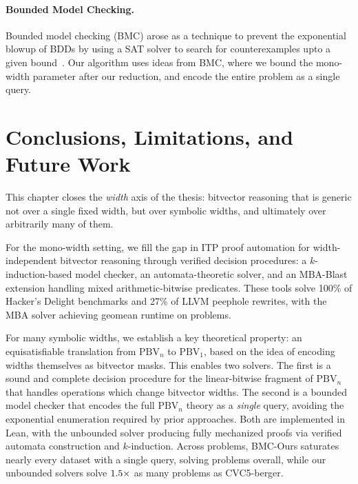 \paragraph{Bounded Model Checking.}
Bounded model checking (BMC) arose as a technique to prevent the exponential blowup of BDDs
by using a SAT solver to search for counterexamples upto a given bound~\cite{biere2009bounded}.
Our algorithm uses ideas from BMC, where we bound the mono-width parameter after our reduction, and encode the entire problem as a single \qfbv{} query.

\section{Conclusions, Limitations, and Future Work}
\label{sec:pbv:conclusion}

This chapter closes the \emph{width} axis of the thesis: bitvector reasoning
that is generic not over a single fixed width, but over symbolic widths, and
ultimately over arbitrarily many of them.

For the mono-width setting, we fill the gap in ITP proof automation for
width-independent bitvector reasoning through verified decision procedures:
a $k$-induction-based model checker, an automata-theoretic solver, and an
MBA-Blast extension handling mixed arithmetic-bitwise predicates. These tools
solve 100\% of Hacker's Delight benchmarks and 27\% of LLVM peephole rewrites,
with the MBA solver achieving \MBAMBAGeoMean{} geomean runtime on
\MBATotalProblems{} problems.

For many symbolic widths, we establish a key theoretical property: an
equisatisfiable translation from $\text{PBV}_n$ to $\text{PBV}_1$, based on the
idea of encoding widths themselves as bitvector masks. This enables two solvers.
The first is a sound and complete decision procedure for the linear-bitwise
fragment of $\text{PBV}_n$ that handles operations which change bitvector widths.
The second is a bounded model checker that encodes the full $\text{PBV}_n$ theory
as a \emph{single} \qfbv{} query, avoiding the exponential enumeration required
by prior approaches. Both are implemented in Lean, with the unbounded solver
producing fully mechanized proofs via verified automata construction and
$k$-induction. Across \EverybenchNumProblemsTotal{} problems, BMC-Ours saturates
nearly every dataset with a single \qfbv{} query, solving
\EverybenchNumSolvedMbmc{} problems overall, while our unbounded solvers solve
$1.5{}\times$ as many problems as CVC5-berger.

